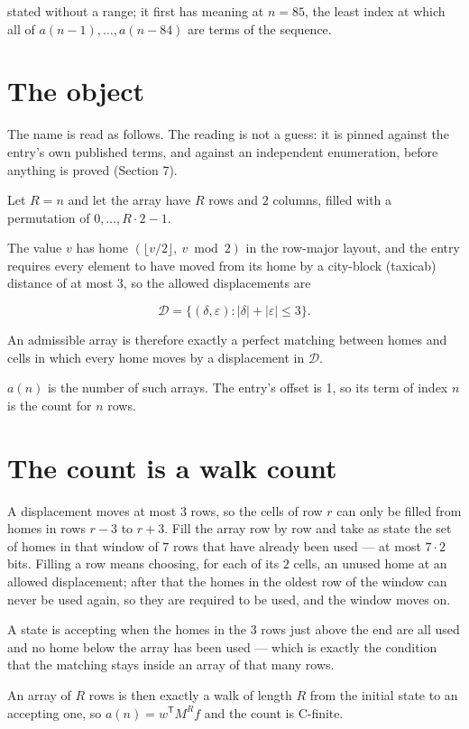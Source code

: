 \documentclass[11pt]{article}
\theoremstyle{definition}
\begin{document}
stated without a range; it first has meaning at $n = 85$, the least index at which all of $a(n-1),\dots,a(n-84)$ are terms of the sequence.

\section{The object}

The name is read as follows. The reading is not a guess: it is pinned against the entry's own published terms, and against an independent enumeration, before anything is proved (Section 7).

Let $R = n$ and let the array have $R$ rows and $2$ columns, filled with a permutation of $0,\dots,R\cdot2-1$.

The value $v$ has home $(\lfloor v/2\rfloor,\ v \bmod 2)$ in the row-major layout, and the entry requires every element to have moved from its home by a city-block (taxicab) distance of at most $3$, so the allowed displacements are

\[\mathcal{D} = \{(\delta,\varepsilon) : |\delta| + |\varepsilon| \le 3\}.\]

An admissible array is therefore exactly a perfect matching between homes and cells in which every home moves by a displacement in $\mathcal{D}$.

$a(n)$ is the number of such arrays. The entry's offset is 1, so its term of index $n$ is the count for $n$ rows.

\section{The count is a walk count}

A displacement moves at most $3$ rows, so the cells of row $r$ can only be filled from homes in rows $r-3$ to $r+3$. Fill the array row by row and take as state the set of homes in that window of $7$ rows that have already been used --- at most $7\cdot2$ bits. Filling a row means choosing, for each of its $2$ cells, an unused home at an allowed displacement; after that the homes in the oldest row of the window can never be used again, so they are required to be used, and the window moves on.

A state is accepting when the homes in the $3$ rows just above the end are all used and no home below the array has been used --- which is exactly the condition that the matching stays inside an array of that many rows.

An array of $R$ rows is then exactly a walk of length $R$ from the initial state to an accepting one, so $a(n) = w^{\mathsf T}M^{R}f$ and the count is C-finite.
\end{document}
